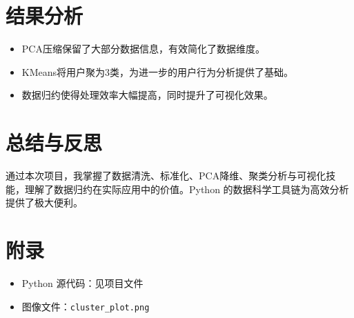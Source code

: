 \documentclass[10pt]{ctexart}
\begin{document}
\section{结果分析}
\begin{itemize}
    \item PCA压缩保留了大部分数据信息，有效简化了数据维度。
    \item KMeans将用户聚为3类，为进一步的用户行为分析提供了基础。
    \item 数据归约使得处理效率大幅提高，同时提升了可视化效果。
\end{itemize}

\section{总结与反思}
通过本次项目，我掌握了数据清洗、标准化、PCA降维、聚类分析与可视化技能，理解了数据归约在实际应用中的价值。Python 的数据科学工具链为高效分析提供了极大便利。

\section*{附录}
\begin{itemize}
    \item Python 源代码：见项目文件
    \item 图像文件：\texttt{cluster\_plot.png}
\end{itemize}
\end{document}
